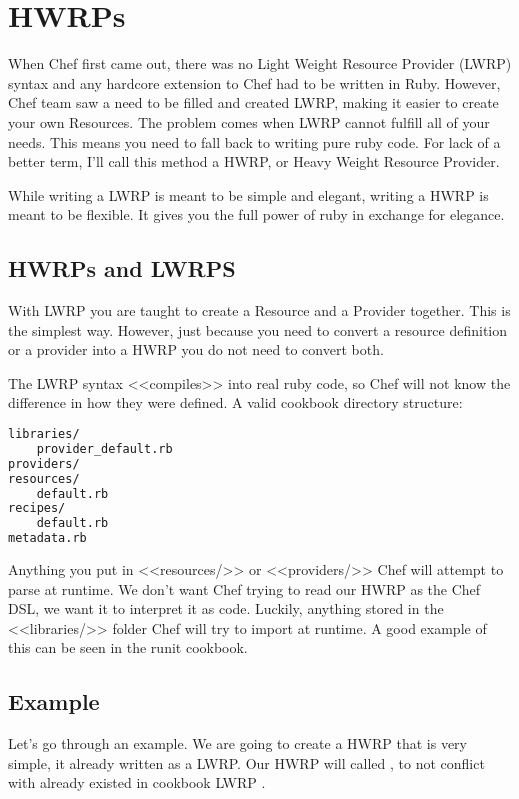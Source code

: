 \section{HWRPs}
\label{sec:cookbook-hwrp}

When Chef first came out, there was no Light Weight Resource Provider (LWRP) syntax and any hardcore extension to Chef had to be written in Ruby. However, Chef team saw a need to be filled and created LWRP, making it easier to create your own Resources. The problem comes when LWRP cannot fulfill all of your needs. This means you need to fall back to writing pure ruby code. For lack of a better term, I'll call this method a HWRP, or Heavy Weight Resource Provider.

While writing a LWRP is meant to be simple and elegant, writing a HWRP is meant to be flexible. It gives you the full power of ruby in exchange for elegance.

\subsection{HWRPs and LWRPS}

With LWRP you are taught to create a Resource and a Provider together. This is the simplest way. However, just because you need to convert a resource definition or a provider into a HWRP you do not need to convert both.

The LWRP syntax <<compiles>> into real ruby code, so Chef will not know the difference in how they were defined. A valid cookbook directory structure:

\begin{lstlisting}[language=Bash,label=lst:cookbook-hwrp1]
libraries/
    provider_default.rb
providers/
resources/
    default.rb
recipes/
    default.rb
metadata.rb
\end{lstlisting}

Anything you put in <<resources/>> or <<providers/>> Chef will attempt to parse at runtime. We don't want Chef trying to read our HWRP as the Chef DSL, we want it to interpret it as code. Luckily, anything stored in the <<libraries/>> folder Chef will try to import at runtime. A good example of this can be seen in the runit cookbook.

\subsection{Example}

Let's go through an example. We are going to create a HWRP that is very simple, it already written as a LWRP. Our HWRP will called , to not conflict with already existed in cookbook LWRP .

